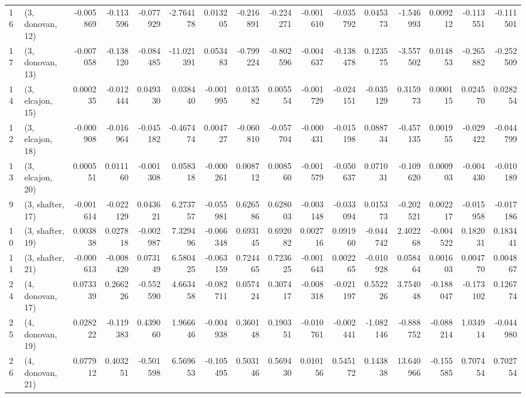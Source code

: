 \begin{tabular}{llrrrrrrrrrrrrrr}
16 &  (3, donovan, 12) &  -0.005869 & -0.113596 & -0.077929 &  -2.764178 &  0.013205 &  -0.216891 & -0.224271 & -0.001610 & -0.035792 &  0.045373 &  -1.546993 &  0.009212 & -0.113551 & -0.111501 \\
17 &  (3, donovan, 13) &  -0.007058 & -0.138120 & -0.084485 & -11.021391 &  0.053483 &  -0.799224 & -0.802596 & -0.004637 & -0.138478 &  0.123575 &  -3.557502 &  0.014853 & -0.265882 & -0.252509 \\
14 &  (3, elcajon, 15) &   0.000235 & -0.012444 &  0.049330 &   0.038440 & -0.001995 &   0.013582 &  0.005554 & -0.001729 & -0.024151 & -0.035129 &   0.315973 &  0.000115 &  0.024570 &  0.028254 \\
12 &  (3, elcajon, 18) &  -0.000908 & -0.016964 & -0.045182 &  -0.467474 &  0.004727 &  -0.060810 & -0.057704 & -0.000431 & -0.015198 &  0.088734 &  -0.457135 &  0.001955 & -0.029422 & -0.044799 \\
13 &  (3, elcajon, 20) &   0.000551 &  0.011160 & -0.001308 &   0.058318 & -0.000261 &   0.008712 &  0.008560 & -0.001579 & -0.050637 &  0.071031 &  -0.109620 &  0.000903 & -0.004430 & -0.010189 \\
9  &  (3, shafter, 17) &  -0.001614 & -0.022129 &  0.043621 &   6.273757 & -0.055981 &   0.626586 &  0.628003 & -0.003148 & -0.033094 &  0.015373 &  -0.202521 &  0.002217 & -0.015958 & -0.017186 \\
10 &  (3, shafter, 19) &   0.003838 &  0.027818 & -0.002987 &   7.329496 & -0.066348 &   0.693145 &  0.692082 &  0.002716 &  0.091960 & -0.044742 &   2.402268 & -0.004522 &  0.182031 &  0.183441 \\
11 &  (3, shafter, 21) &  -0.000613 & -0.008420 &  0.073149 &   6.580425 & -0.063159 &   0.724465 &  0.723625 & -0.001643 &  0.002265 & -0.010928 &   0.058464 &  0.001603 &  0.004770 &  0.004867 \\
24 &  (4, donovan, 17) &   0.073339 &  0.266226 & -0.552590 &   4.663458 & -0.082711 &   0.057424 &  0.307417 & -0.008318 & -0.021197 &  0.552226 &   3.754048 & -0.188047 & -0.173102 &  0.126774 \\
25 &  (4, donovan, 19) &   0.028222 & -0.119383 &  0.439060 &   1.966646 & -0.004938 &   0.360148 &  0.190351 & -0.010761 & -0.002441 & -1.082146 &  -0.888752 & -0.088214 &  1.034914 & -0.044980 \\
26 &  (4, donovan, 21) &   0.077912 &  0.403251 & -0.501598 &   6.569653 & -0.105495 &   0.503146 &  0.569430 &  0.010156 &  0.545172 &  0.143838 &  13.640966 & -0.155585 &  0.707454 &  0.702754 \\

\end{tabular}
